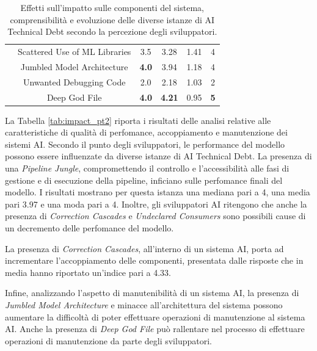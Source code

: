\begin{table}[h!]
\begin{tabular}{|l|c|c|c|c|c|}
& Scattered Use of ML Libraries & 3.5 & 3.28 & 1.41 & 4  \\
& Jumbled Model Architecture & \textbf{4.0} & 3.94 & 1.18 & 4  \\
& Unwanted Debugging Code & 2.0 & 2.18 & 1.03 & 2  \\
& Deep God File & \textbf{4.0} & \textbf{4.21} & 0.95 & \textbf{5}  \\
    \hline
    \end{tabular}
    \caption{Effetti sull'impatto sulle componenti del sistema, comprensibilità e evoluzione delle diverse istanze di AI Technical Debt secondo la percezione degli sviluppatori.}
    \label{tab:impact_pt1}
\end{table}

La Tabella \ref{tab:impact_pt2} riporta i risultati delle analisi relative alle caratteristiche di qualità di perfomance, accoppiamento e manutenzione dei sistemi AI.
Secondo il punto degli sviluppatori, le performance del modello possono essere influenzate da diverse istanze di AI Technical Debt. La presenza di una \textit{Pipeline Jungle}, compromettendo il controllo e l'accessibilità alle fasi di gestione e di esecuzione della pipeline, inficiano sulle perfomance finali del modello. I risultati mostrano per questa istanza una mediana pari a 4, una media pari 3.97 e una moda pari a 4.
Inoltre, gli sviluppatori AI ritengono che anche la presenza di \textit{Correction Cascades} e \textit{Undeclared Consumers} sono possibili cause di un decremento delle perfomance del modello.

La presenza di \textit{Correction Cascades}, all'interno di un sistema AI, porta ad incrementare l'accoppiamento delle componenti, presentata dalle risposte che in media hanno riportato un'indice pari a 4.33.

Infine, analizzando l'aspetto di manutenibilità di un sistema AI, la presenza di \textit{Jumbled Model Architecture} e minacce all'architettura del sistema possono aumentare la difficoltà di poter effettuare operazioni di manutenzione al sistema AI.
Anche la presenza di \textit{Deep God File} può rallentare nel processo di effettuare operazioni di manutenzione da parte degli sviluppatori.


